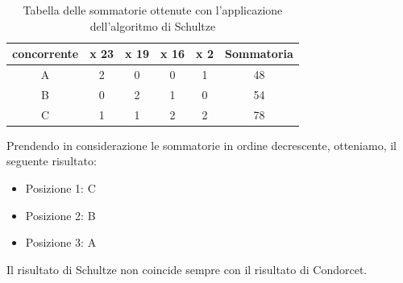 \documentclass[12pt,a4paper,openright,twoside]{book}
\begin{document}
\begin{table}[H]
    \centering
    \begin{tabular}{|c|c|c|c|c|c|}
    \hline
    \multicolumn{1}{|l|}{concorrente} & \multicolumn{1}{|l|}{x 23} & \multicolumn{1}{|l|}{x 19} & \multicolumn{1}{l|}{x 16} & \multicolumn{1}{l|}{x 2} & \multicolumn{1}{l|}{Sommatoria} \\ \hline
    A & 2 & 0 & 0 & 1 & 48                              \\ \hline
    B & 0 & 2 & 1 & 0 & 54                              \\ \hline
    C & 1 & 1 & 2 & 2 & 78                             \\ \hline
  
    \end{tabular}
    \caption{Tabella delle sommatorie ottenute con l'applicazione dell'algoritmo di Schultze}
    \label{table:risultatischultze}
\end{table}

Prendendo in considerazione le sommatorie in ordine decrescente, otteniamo, il seguente risultato:
\begin{itemize}
    \item{Posizione 1: C}
    \item{Posizione 2: B}
    \item{Posizione 3: A}
\end{itemize} 

Il risultato di Schultze non coincide sempre con il risultato di Condorcet.

\newpage
\end{document}
